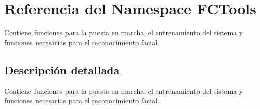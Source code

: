 \hypertarget{namespace_f_c_tools}{}\section{Referencia del Namespace F\+C\+Tools}
\label{namespace_f_c_tools}


Contiene funciones para la puesta en marcha, el entrenamiento del sistema y funciones necesarias para el reconocimiento facial.  




\subsection{Descripción detallada}
Contiene funciones para la puesta en marcha, el entrenamiento del sistema y funciones necesarias para el reconocimiento facial. 


